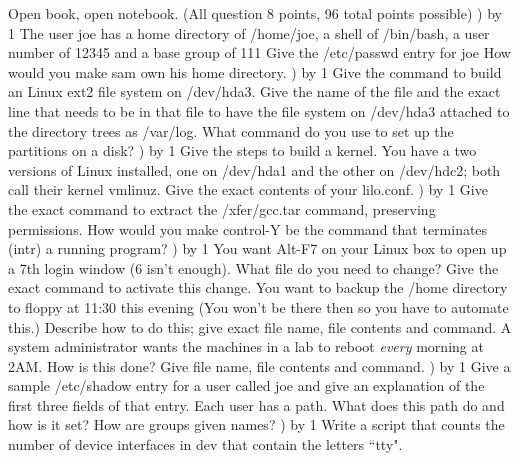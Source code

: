 
\parindent=0in
\nopagenumbers
\newcount\quesno
{}
\def\ques{\number\quesno) \advance\quesno by 1}
\def\aspace{\vskip 1.5in}

Open book, open notebook. (All question 8 points, 96 total points possible)
\hfill\break
\ques
The user {\ltt{}joe} has  a home directory of {\ltt{}/home/joe},
a shell of {\ltt{}/bin/bash}, a user number of {\ltt{}12345}
and a base group of {\ltt{}111}
Give the {\ltt{}/etc/passwd} entry for {\ltt{}joe}
\vskip 0.4in
How would you make {\ltt{}sam} own his home directory.
\vskip 0.4in
\ques
Give the command to build an Linux ext2 file system on {\ltt{}/dev/hda3}.
\vskip 0.5in
Give the name of the file and the exact line that needs to be in that file to
have the file system on {\ltt{}/dev/hda3} attached to the directory trees
as {\ltt{}/var/log}.
\vskip 0.5in
What command do you use to set up the partitions on a disk?
\vskip 0.4in
\ques
Give the steps to build a kernel.
\vskip 2.0in
You have a two versions of Linux installed, one on {\ltt{}/dev/hda1}
and the other on {\ltt{}/dev/hdc2}; both call their kernel {\ltt{}vmlinuz}.
Give the exact contents of your {\ltt{}lilo.conf}.
\vskip 1.8in
\vfill\eject
\ques
Give the exact command to extract the {\ltt{}/xfer/gcc.tar} command,
preserving permissions.
\vskip 0.4in
How would you make control-Y be the command that terminates ({\ltt{}intr})
a running program?
\vskip 0.4in
\ques
You want Alt-F7 on your Linux box to open up a 7th login window (6 isn't enough).
What file do you need to change? Give the exact command to activate this change.
\vskip 0.8in
You want to backup the {\ltt{}/home} directory to floppy at 11:30 this evening
(You won't be there then so you have to automate this.)
Describe how to do this; give exact file name, file contents and command.
\vskip 1.2in
A system administrator wants the machines in a lab to reboot {\it every} morning
at 2AM.
How is this done? Give file name, file contents and command.
\vskip 1.4in
\ques
Give a sample {\ltt{}/etc/shadow} entry for a user called {\ltt{}joe} and give an
explanation of the first three fields of that entry.
\vskip 1.5in
Each user has a path. What does this path do and how is it set?
\vskip 1.0in
How are groups given names?
\vskip 0.5in
\vfill\eject
\ques
Write a script that counts the number of device interfaces in {\ltt{}dev}
that contain the letters ``{\ltt{}tty}".
